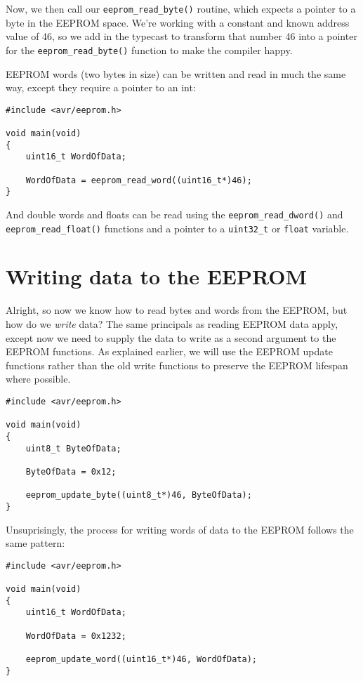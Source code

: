 \documentclass[a4paper,oneside,notitlepage]{book}
\begin{document}
Now, we then call our \lstinline{eeprom_read_byte()} routine, which expects a pointer to a byte in the EEPROM space. We're working with a constant and known address value of 46, so we add in the typecast to transform that number 46 into a pointer for the \lstinline{eeprom_read_byte()} function to make the compiler happy.

EEPROM words (two bytes in size) can be written and read in much the same way, except they require a pointer to an int:

\begin{center}
\begin{lstlisting}
#include <avr/eeprom.h>

void main(void)
{
    uint16_t WordOfData;

    WordOfData = eeprom_read_word((uint16_t*)46);
}
\end{lstlisting}
\end{center}

And double words and floats can be read using the \lstinline{eeprom_read_dword()} and \lstinline{eeprom_read_float()} functions and a pointer to a \lstinline{uint32_t} or \lstinline{float} variable.

\chapter{Writing data to the EEPROM}

Alright, so now we know how to read bytes and words from the EEPROM, but how do we \textit{write} data? The same principals as reading EEPROM data apply, except now we need to supply the data to write as a second argument to the EEPROM functions. As explained earlier, we will use the EEPROM update functions rather than the old write functions to preserve the EEPROM lifespan where possible.

\begin{center}
\begin{lstlisting}
#include <avr/eeprom.h>

void main(void)
{
    uint8_t ByteOfData;

    ByteOfData = 0x12;

    eeprom_update_byte((uint8_t*)46, ByteOfData);
}
\end{lstlisting}
\end{center}

Unsuprisingly, the process for writing words of data to the EEPROM follows the same pattern:

\begin{center}
\begin{lstlisting}
#include <avr/eeprom.h>

void main(void)
{
    uint16_t WordOfData;

    WordOfData = 0x1232;

    eeprom_update_word((uint16_t*)46, WordOfData);
}
\end{lstlisting}
\end{center}
\end{document}
